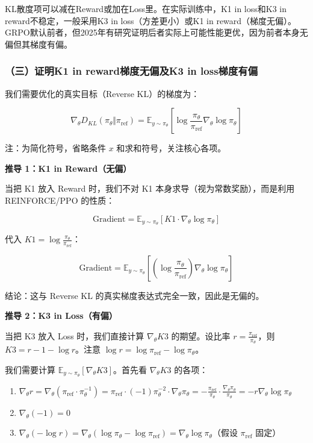 KL散度项可以减在Reward或加在Loss里。在实际训练中，K1 in loss和K3 in reward不稳定，一般采用K3 in loss（方差更小）或K1 in reward（梯度无偏）。GRPO默认前者，但2025年有研究证明后者实际上可能性能更优，因为前者本身无偏但其梯度有偏。

\hypertarget{ux4e09ux8bc1ux660ek1-in-rewardux68afux5ea6ux65e0ux504fux53cak3-in-lossux68afux5ea6ux6709ux504f}{%
\subsubsection{（三）证明K1 in reward梯度无偏及K3 in loss梯度有偏}\label{ux4e09ux8bc1ux660ek1-in-rewardux68afux5ea6ux65e0ux504fux53cak3-in-lossux68afux5ea6ux6709ux504f}}

我们需要优化的真实目标（Reverse KL）的梯度为：

\[
\nabla_\theta D_{KL}(\pi_\theta \Vert \pi_{\mathrm{ref}})
=\mathbb{E}_{y\sim\pi_\theta}\left[
\log\frac{\pi_\theta}{\pi_{\mathrm{ref}}}\nabla_\theta\log\pi_\theta
\right]
\]

注：为简化符号，省略条件 \(x\) 和求和符号，关注核心各项。

\textbf{推导 1：K1 in Reward（无偏）}

当把 K1 放入 Reward 时，我们不对 K1 本身求导（视为常数奖励），而是利用 REINFORCE/PPO 的性质：

\[
\mathrm{Gradient}
=\mathbb{E}_{y\sim\pi_\theta}\left[K1\cdot\nabla_\theta\log\pi_\theta\right]
\]

代入 \(K1=\log\frac{\pi_\theta}{\pi_{\mathrm{ref}}}\)：

\[
\mathrm{Gradient}
=\mathbb{E}_{y\sim\pi_\theta}\left[
\left(\log\frac{\pi_\theta}{\pi_{\mathrm{ref}}}\right)
\nabla_\theta\log\pi_\theta
\right]
\]

结论：这与 Reverse KL 的真实梯度表达式完全一致，因此是无偏的。

\textbf{推导 2：K3 in Loss（有偏）}

当把 K3 放入 Loss 时，我们直接计算 \(\nabla_\theta K3\) 的期望。设比率 \(r=\frac{\pi_{\mathrm{ref}}}{\pi_\theta}\)，则 \(K3=r-1-\log r\)。注意 \(\log r=\log\pi_{\mathrm{ref}}-\log\pi_\theta\)。

我们需要计算 \(\mathbb{E}_{y\sim\pi_\theta}[\nabla_\theta K3]\)。首先看 \(\nabla_\theta K3\) 的各项：

\begin{enumerate}
\def\labelenumi{\arabic{enumi}.}
\tightlist
\item
  \(\nabla_\theta r=\nabla_\theta(\pi_{\mathrm{ref}}\cdot\pi_\theta^{-1})=\pi_{\mathrm{ref}}\cdot(-1)\pi_\theta^{-2}\cdot\nabla_\theta\pi_\theta=-\frac{\pi_{\mathrm{ref}}}{\pi_\theta}\cdot\frac{\nabla_\theta\pi_\theta}{\pi_\theta}=-r\nabla_\theta\log\pi_\theta\)
\item
  \(\nabla_\theta(-1)=0\)
\item
  \(\nabla_\theta(-\log r)=\nabla_\theta(\log\pi_\theta-\log\pi_{\mathrm{ref}})=\nabla_\theta\log\pi_\theta\)（假设 \(\pi_{\mathrm{ref}}\) 固定）
\end{enumerate}

